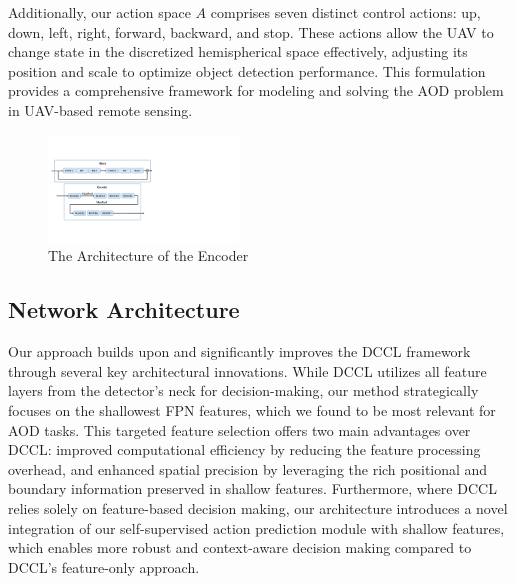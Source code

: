 \documentclass[lettersize,journal]{IEEEtran}
\begin{document}
Additionally, our action space $A$ comprises seven distinct control actions: up, down, left, right, forward, backward, and stop. These actions allow the UAV to change state in the discretized hemispherical space effectively, adjusting its position and scale to optimize object detection performance. This formulation provides a comprehensive framework for modeling and solving the AOD problem in UAV-based remote sensing.

\begin{figure}[!t]
    \centering
    \includegraphics[width=0.45\textwidth]{fig/encoder.pdf}
    \caption{The Architecture of the Encoder}
    \label{Encoder}
\end{figure}

\subsection{Network Architecture}

Our approach builds upon and significantly improves the DCCL framework through several key architectural innovations. While DCCL utilizes all feature layers from the detector's neck for decision-making, our method strategically focuses on the shallowest FPN features, which we found to be most relevant for AOD tasks. This targeted feature selection offers two main advantages over DCCL: improved computational efficiency by reducing the feature processing overhead, and enhanced spatial precision by leveraging the rich positional and boundary information preserved in shallow features.  Furthermore, where DCCL relies solely on feature-based decision making, our architecture introduces a novel integration of our self-supervised action prediction module with shallow features, which enables more robust and context-aware decision making compared to DCCL's feature-only approach.
\end{document}
